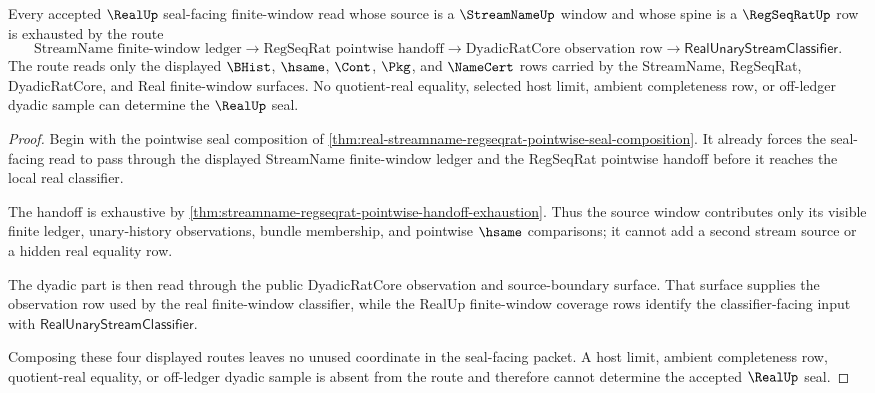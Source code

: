 \begin{theorem}
\label{thm:realup-streamname-regseqrat-dyadic-window-exhaustion}
Every accepted $\RealUp$ seal-facing finite-window read whose source is a $\StreamNameUp$ window and whose spine is a $\RegSeqRatUp$ row is exhausted by the route
$$
\text{StreamName finite-window ledger}
\to
\text{RegSeqRat pointwise handoff}
\to
\text{DyadicRatCore observation row}
\to
\mathsf{RealUnaryStreamClassifier}.
$$
The route reads only the displayed $\BHist$, $\hsame$, $\Cont$, $\Pkg$, and $\NameCert$ rows carried by the StreamName, RegSeqRat, DyadicRatCore, and Real finite-window surfaces. No quotient-real equality, selected host limit, ambient completeness row, or off-ledger dyadic sample can determine the $\RealUp$ seal.
\end{theorem}
\begin{proof}
Begin with the pointwise seal composition of \autoref{thm:real-streamname-regseqrat-pointwise-seal-composition}. It already forces the seal-facing read to pass through the displayed StreamName finite-window ledger and the RegSeqRat pointwise handoff before it reaches the local real classifier.

The handoff is exhaustive by \autoref{thm:streamname-regseqrat-pointwise-handoff-exhaustion}. Thus the source window contributes only its visible finite ledger, unary-history observations, bundle membership, and pointwise $\hsame$ comparisons; it cannot add a second stream source or a hidden real equality row.

The dyadic part is then read through the public DyadicRatCore observation and source-boundary surface. That surface supplies the observation row used by the real finite-window classifier, while the RealUp finite-window coverage rows identify the classifier-facing input with $\mathsf{RealUnaryStreamClassifier}$.

Composing these four displayed routes leaves no unused coordinate in the seal-facing packet. A host limit, ambient completeness row, quotient-real equality, or off-ledger dyadic sample is absent from the route and therefore cannot determine the accepted $\RealUp$ seal.
\end{proof}

